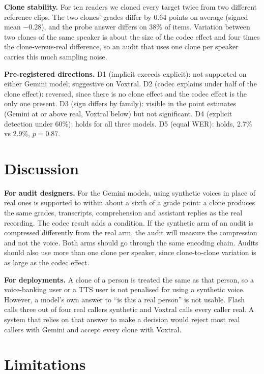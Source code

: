 \textbf{Clone stability.} For ten readers we cloned every target twice from two different reference clips. The two clones' grades differ by 0.64 points on average (signed mean $-0.28$), and the probe answer differs on 38\% of items. Variation between two clones of the same speaker is about the size of the codec effect and four times the clone-versus-real difference, so an audit that uses one clone per speaker carries this much sampling noise.

\textbf{Pre-registered directions.} D1 (implicit exceeds explicit): not supported on either Gemini model; suggestive on Voxtral. D2 (codec explains under half of the clone effect): reversed, since there is no clone effect and the codec effect is the only one present. D3 (sign differs by family): visible in the point estimates (Gemini at or above real, Voxtral below) but not significant. D4 (explicit detection under 60\%): holds for all three models. D5 (equal WER): holds, 2.7\% vs 2.9\%, $p = 0.87$.

\section{Discussion}
\label{sec:discussion}

\textbf{For audit designers.} For the Gemini models, using synthetic voices in place of real ones is supported to within about a sixth of a grade point: a clone produces the same grades, transcripts, comprehension and assistant replies as the real recording. The codec result adds a condition. If the synthetic arm of an audit is compressed differently from the real arm, the audit will measure the compression and not the voice. Both arms should go through the same encoding chain. Audits should also use more than one clone per speaker, since clone-to-clone variation is as large as the codec effect.

\textbf{For deployments.} A clone of a person is treated the same as that person, so a voice-banking user or a TTS user is not penalised for using a synthetic voice. However, a model's own answer to ``is this a real person'' is not usable. Flash calls three out of four real callers synthetic and Voxtral calls every caller real. A system that relies on that answer to make a decision would reject most real callers with Gemini and accept every clone with Voxtral.

\section{Limitations}
\label{sec:limitations}

